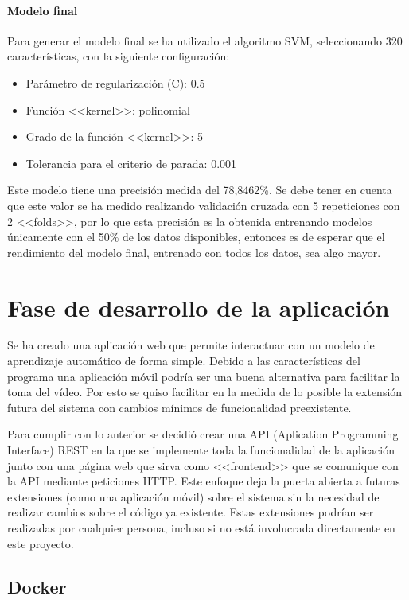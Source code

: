 \paragraph{Modelo final} Para generar el modelo final se ha utilizado el
algoritmo SVM, seleccionando 320 características, con la siguiente
configuración:

\begin{itemize}
    \item Parámetro de regularización (C): 0.5
    \item Función <<kernel>>: polinomial
    \item Grado de la función <<kernel>>: 5
    \item Tolerancia para el criterio de parada: 0.001
\end{itemize}

Este modelo tiene una precisión medida del 78,8462\%. Se debe tener en cuenta
que este valor se ha medido realizando validación cruzada con 5 repeticiones con
2 <<folds>>, por lo que esta precisión es la obtenida entrenando modelos
únicamente con el 50\% de los datos disponibles, entonces es de esperar que el
rendimiento del modelo final, entrenado con todos los datos, sea algo mayor.

\section{Fase de desarrollo de la aplicación}

Se ha creado una aplicación web que permite interactuar con un modelo de
aprendizaje automático de forma simple. Debido a las características del
programa una aplicación móvil podría ser una buena alternativa para facilitar la
toma del vídeo. Por esto se quiso facilitar en la medida de lo posible la
extensión futura del sistema con cambios mínimos de funcionalidad preexistente.

Para cumplir con lo anterior se decidió crear una API (Aplication Programming
Interface) REST en la que se implemente toda la funcionalidad de la aplicación
junto con una página web que sirva como <<frontend>> que se comunique con la API
mediante peticiones HTTP. Este enfoque deja la puerta abierta a futuras
extensiones (como una aplicación móvil) sobre el sistema sin la necesidad de
realizar cambios sobre el código ya existente. Estas extensiones podrían ser
realizadas por cualquier persona, incluso si no está involucrada directamente en
este proyecto.

\subsection{Docker}

